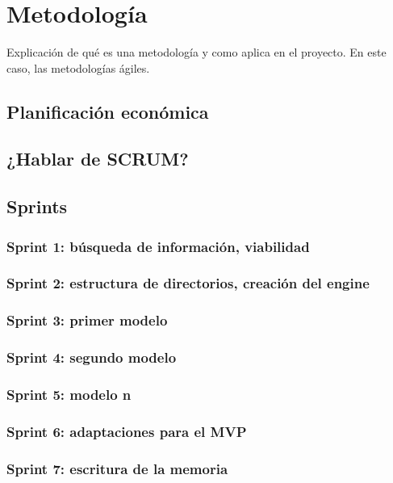 
\chapter{Metodología}
\label{chap:metodologia}

Explicación de qué es una metodología y como aplica en el proyecto. En este caso, las metodologías ágiles.

\section{Planificación económica}

\section{¿Hablar de SCRUM?}

\section{Sprints}

\subsection{Sprint 1: búsqueda de información, viabilidad}
\subsection{Sprint 2: estructura de directorios, creación del engine}
\subsection{Sprint 3: primer modelo}
\subsection{Sprint 4: segundo modelo}
\subsection{Sprint 5: modelo n}
\subsection{Sprint 6: adaptaciones para el MVP}
\subsection{Sprint 7: escritura de la memoria}
